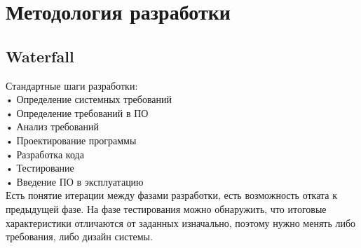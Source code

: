 \documentclass{article}
\begin{document}
\section{Методология разработки}
\subsection{Waterfall}
Стандартные шаги разработки:\\
• Определение системных требований \\
• Определение требований в ПО\\
• Анализ требований\\
• Проектирование программы\\
• Разработка кода\\
• Тестирование\\
• Введение ПО в эксплуатацию\\
Есть понятие итерации между фазами разработки, есть возможность отката к предыдущей фазе. На фазе тестирования можно обнаружить, что итоговые характеристики отличаются от заданных изначально, поэтому нужно менять либо требования, либо дизайн системы.
\end{document}
